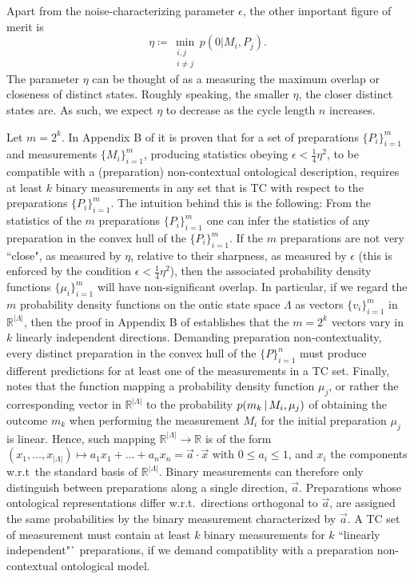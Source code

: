 Apart from the noise-characterizing parameter $\epsilon$, the other important figure of merit is
\begin{equation*}
\eta\coloneqq \min_{\substack{i,j \\ i\neq j}} p(0\vert M_i, P_j).
\end{equation*}
The parameter $\eta$ can be thought of as a measuring the maximum overlap or closeness of distinct states. Roughly speaking, the smaller $\eta$, the closer distinct states are. As such, we expect $\eta$ to decrease as the cycle length $n$ increases. 

Let $m=2^k$. In Appendix B of \cite{Pusey2019a} it is proven that for a set of preparations $\{P_i\}_{i=1}^m$ and measurements $\{M_i\}_{i=1}^m$, producing statistics obeying $\epsilon<\frac{1}{4}\eta^2$, to be compatible with a (preparation) non-contextual ontological description, requires at least $k$ binary measurements in any set that is TC with respect to the preparations $\{P_i\}_{i=1}^m$. The intuition behind this is the following: From the statistics of the $m$ preparations $\{P_i\}_{i=1}^m$ one can infer the statistics of any preparation in the convex hull of the $\{P_i\}_{i=1}^m$. If the $m$ preparations are not very ``close", as measured by $\eta$, relative to their sharpness, as measured by $\epsilon$ (this is enforced by the condition $\epsilon<\frac{1}{4}\eta^2$), then the associated probability density functions $\{\mu_i\}_{i=1}^m$ will have non-significant overlap. In particular, if we regard the $m$ probability density functions on the ontic state space $\Lambda$ as vectors $\{v_i\}_{i=1}^m$ in $\mathbb{R}^{\vert \Lambda \vert}$, then the proof in Appendix B of \cite{Pusey2019a} establishes that the $m=2^k$ vectors vary in $k$ linearly independent directions. Demanding preparation non-contextuality, every distinct preparation in the convex hull of the $\{P\}_{i=1}^n$ must produce different predictions for at least one of the measurements in a TC set. Finally, \cite{Pusey2019a} notes that the function mapping a probability density function $\mu_j$, or rather the corresponding vector in $\mathbb{R}^{\vert \Lambda \vert}$ to the probability $p(m_k\thinspace\vert\thinspace M_i,\mu_j)$ of obtaining the outcome $m_k$ when performing the measurement $M_i$ for the initial preparation $\mu_j$ is linear. Hence, such mapping $\mathbb{R}^{\vert \Lambda \vert}\rightarrow\mathbb{R}$ is of the form $(x_1,\dots,x_{\vert \Lambda \vert})\mapsto a_1 x_1+\dots + a_n x_n = \vec{a}\cdot \vec{x}$ with $0 \leq a_i \leq 1$, and $x_i$ the components w.r.t\ the standard basis of $\mathbb{R}^{\vert \Lambda \vert}$. Binary measurements can therefore only distinguish between preparations along a single direction, $\vec{a}$. Preparations whose ontological representations differ w.r.t.\ directions orthogonal to $\vec{a}$, are assigned the same probabilities by the binary measurement characterized by $\vec{a}$. A TC set of measurement must contain at least $k$ binary measurements for $k$ ``linearly independent"` preparations, if we demand compatiblity with a preparation non-contextual ontological model.

